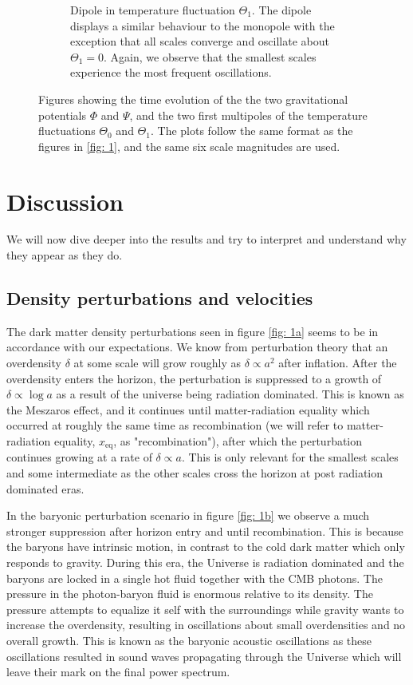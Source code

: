 \documentclass[a4paper, 10pt, reqno]{amsart}
\begin{document}
\begin{figure}
{\begin{subfigure}[t]{0.7\textwidth}
    \caption{Dipole in temperature fluctuation $\Theta_1$. The dipole displays a similar behaviour to the monopole with the exception that all scales converge and oscillate about $\Theta_1 = 0$. Again, we observe that the smallest scales experience the most frequent oscillations. } 
    \label{fig: 2d} 
  \end{subfigure} 
  }
  \caption{Figures showing the time evolution of the the two gravitational potentials $\Phi$ and $\Psi$, and the two first multipoles of the temperature fluctuations $\Theta_0$ and $\Theta_1$. The plots follow the same format as the figures in \ref{fig: 1}, and the same six scale magnitudes are used.}
  \label{fig: 2} 
\end{figure}

\section{Discussion}
We will now dive deeper into the results and try to interpret and understand why they appear as they do.

\subsection{Density perturbations and velocities}
The dark matter density perturbations seen in figure \ref{fig: 1a} seems to be in accordance with our expectations. We know from perturbation theory that an overdensity $\delta$ at some scale will grow roughly as $\delta \propto a^2$ after inflation. After the overdensity enters the horizon, the perturbation is suppressed to a growth of $\delta \propto \log a$ as a result of the universe being radiation dominated. This is known as the Meszaros effect, and it continues until matter-radiation equality which occurred at roughly the same time as recombination (we will refer to matter-radiation equality, $x_{\mathrm{eq}}$, as "recombination"), after which the perturbation continues growing at a rate of $\delta \propto a$. This is only relevant for the smallest scales and some intermediate as the other scales cross the horizon at post radiation dominated eras.

In the baryonic perturbation scenario in figure \ref{fig: 1b} we observe a much stronger suppression after horizon entry and until recombination. This is because the baryons have intrinsic motion, in contrast to the cold dark matter which only responds to gravity. During this era, the Universe is radiation dominated and the baryons are locked in a single hot fluid together with the CMB photons. The pressure in the photon-baryon fluid is enormous relative to its density. The pressure attempts to equalize it self with the surroundings while gravity wants to increase the overdensity, resulting in oscillations about small overdensities and no overall growth. This is known as the baryonic acoustic oscillations as these oscillations resulted in sound waves propagating through the Universe which will leave their mark on the final power spectrum.
\end{document}

